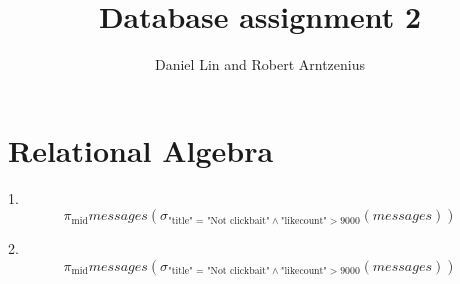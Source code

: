 \documentclass{article}
\title{Database assignment 2}
\author{Daniel Lin and Robert Arntzenius}
\begin{document}
\maketitle

\section{Relational Algebra}

\begin{flushleft}

1.
$$
\pi_{\text{mid}}messages(
\sigma_{\text{"title" = "Not clickbait"} \wedge \text{"likecount"} > 9000 }(messages))
$$

2.
$$
\pi_{\text{mid}}messages(
\sigma_{\text{"title" = "Not clickbait"} \wedge \text{"likecount"} > 9000 }(messages))
$$
\end{flushleft}
\end{document}
